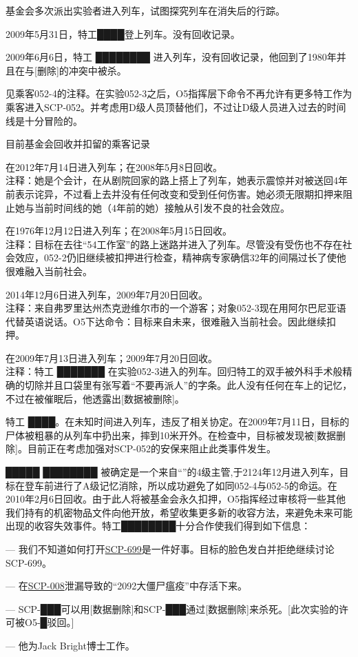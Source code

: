 基金会多次派出实验者进入列车，试图探究列车在消失后的行踪。

2009年5月31日，特工████登上列车。没有回收记录。

2009年6月6日，特工 ████████ 进入列车，没有回收记录，他回到了1980年并且在与{[}删除]的冲突中被杀。

见乘客052-4的注释。在实验052-3之后，O5指挥层下命令不再允许有更多特工作为乘客进入SCP-052。并考虑用D级人员顶替他们，不过让D级人员进入过去的时间线是十分冒险的。

目前基金会回收并扣留的乘客记录

在2012年7月14日进入列车；在2008年5月8日回收。\\
注释：她是个会计，在从剧院回家的路上搭上了列车，她表示震惊并对被送回4年前表示诧异，不过看上去并没有任何改变和受到任何伤害。她必须无限期扣押来阻止她与当前时间线的她（4年前的她）接触从引发不良的社会效应。

在1976年12月12日进入列车；在2008年5月15日回收。\\
注释：目标在去往“54工作室”的路上迷路并进入了列车。尽管没有受伤也不存在社会效应，052-2仍旧继续被扣押进行检查，精神病专家确信32年的间隔过长了使他很难融入当前社会。

2014年12月6日进入列车，2009年7月20日回收。\\
注释：来自弗罗里达州杰克逊维尔市的一个游客；对象052-3现在用阿尔巴尼亚语代替英语说话。O5下达命令：目标来自未来，很难融入当前社会。因此继续扣押。

在2009年7月13日进入列车；2009年7月20日回收。\\
注释：特工 ███████ 在实验052-3进入的列车。回归特工的双手被外科手术般精确的切除并且口袋里有张写着“不要再派人”的字条。此人没有任何在车上的记忆，不过在被催眠后，他透露出{[}数据被删除]。

特工 ████。在未知时间进入列车，违反了相关协定。在2009年7月11日，目标的尸体被粗暴的从列车中扔出来，摔到10米开外。在检查中，目标被发现被{[}数据删除]。目前正在考虑加强对SCP-052的安保来阻止此类事件发生。

█████ ████████ 被确定是一个来自“”的4级主管,于2124年12月进入列车，目标在登车前进行了A级记忆消除，所以成功避免了如同052-4与052-5的命运。在2010年2月6日回收。由于此人将被基金会永久扣押，O5指挥经过审核将一些其他我们持有的机密物品文件向他开放，希望收集更多新的收容方法，来避免未来可能出现的收容失效事件。特工████████十分合作使我们得到如下信息：

— 我们不知道如何打开\hyperref[chap:SCP-699]{SCP-699}是一件好事。目标的脸色发白并拒绝继续讨论SCP-699。

— 在\hyperref[chap:SCP-008]{SCP-008}泄漏导致的“2092大僵尸瘟疫”中存活下来。

— SCP-███可以用{[}数据删除]和SCP-███通过{[}数据删除]来杀死。{[}此次实验的许可被O5-█驳回。]

— 他为Jack Bright博士工作。
